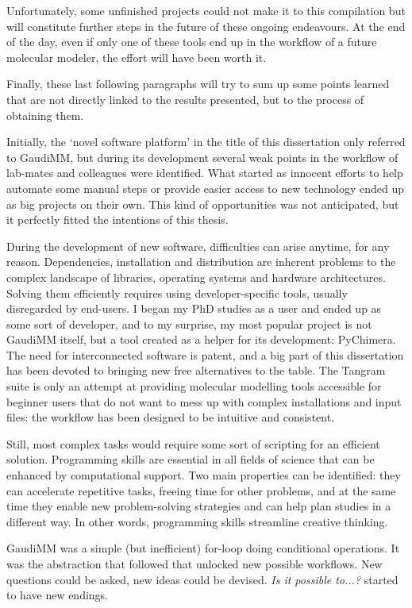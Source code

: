 Unfortunately, some unfinished projects could not make it to this compilation but will constitute further steps in the future of these ongoing endeavours. At the end of the day, even if only one of these tools end up in the workflow of a future molecular modeler, the effort will have been worth it.

Finally, these last following paragraphs will try to sum up some points learned that are not directly linked to the results presented, but to the process of obtaining them.

Initially, the ‘novel software platform’ in the title of this dissertation only referred to GaudiMM, but during its development several weak points in the workflow of lab-mates and colleagues were identified. What started as innocent efforts to help automate some manual steps or provide easier access to new technology ended up as big projects on their own. This kind of opportunities was not anticipated, but it perfectly fitted the intentions of this thesis.

During the development of new software, difficulties can arise anytime, for any reason. Dependencies, installation and distribution are inherent problems to the complex landscape of libraries, operating systems and hardware architectures. Solving them efficiently requires using developer-specific tools, usually disregarded by end-users. I began my PhD studies as a user and ended up as some sort of developer, and to my surprise, my most popular project is not GaudiMM itself, but a tool created as a helper for its development: PyChimera. The need for interconnected software is patent, and a big part of this dissertation has been devoted to bringing new free alternatives to the table. The Tangram suite is only an attempt at providing molecular modelling tools accessible for beginner users that do not want to mess up with complex installations and input files: the workflow has been designed to be intuitive and consistent.

Still, most complex tasks would require some sort of scripting for an efficient solution. Programming skills are essential in all fields of science that can be enhanced by computational support. Two main properties can be identified: they can accelerate repetitive tasks, freeing time for other problems, and at the same time they enable new problem-solving strategies and can help plan studies in a different way. In other words, programming skills streamline creative thinking.

GaudiMM was a simple (but inefficient) for-loop doing conditional operations. It was the abstraction that followed that unlocked new possible workflows. New questions could be asked, new ideas could be devised. \textit{Is it possible to...?} started to have new endings.

